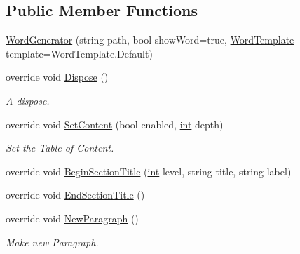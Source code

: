 \subsection*{Public Member Functions}
\begin{DoxyCompactItemize}
\item 
\hyperlink{class_software_engineering_tools_1_1_documentation_1_1_word_generator_af0b26d8845bfd80b944d4a11a2c1124f}{Word\+Generator} (string path, bool show\+Word=true, \hyperlink{class_software_engineering_tools_1_1_documentation_1_1_word_generator_a25625d01bb20e4edcaeede4fde7dcd0e}{Word\+Template} template=Word\+Template.\+Default)
\item 
override void \hyperlink{class_software_engineering_tools_1_1_documentation_1_1_word_generator_adf9f0b03760f695ece98b7c529de9e08}{Dispose} ()
\begin{DoxyCompactList}\small\item\em A dispose. \end{DoxyCompactList}\item 
override void \hyperlink{class_software_engineering_tools_1_1_documentation_1_1_word_generator_acb1d23ef351f76260a319a98751273c2}{Set\+Content} (bool enabled, \hyperlink{namespace_software_engineering_tools_1_1_documentation_a4a8017aa254d1d05b03db5132b7dd3a7afa7153f7ed1cb6c0fcf2ffb2fac21748}{int} depth)
\begin{DoxyCompactList}\small\item\em Set the Table of Content. \end{DoxyCompactList}\item 
override void \hyperlink{class_software_engineering_tools_1_1_documentation_1_1_word_generator_accc00e23ef4d7fa36359715ce4bd3845}{Begin\+Section\+Title} (\hyperlink{namespace_software_engineering_tools_1_1_documentation_a4a8017aa254d1d05b03db5132b7dd3a7afa7153f7ed1cb6c0fcf2ffb2fac21748}{int} level, string title, string label)
\item 
override void \hyperlink{class_software_engineering_tools_1_1_documentation_1_1_word_generator_a6742f94e53dbe5073a80742657e6c938}{End\+Section\+Title} ()
\item 
override void \hyperlink{class_software_engineering_tools_1_1_documentation_1_1_word_generator_a30e09031fd81ba57185fb44d9b0d5f2f}{New\+Paragraph} ()
\begin{DoxyCompactList}\small\item\em Make new Paragraph. \end{DoxyCompactList}\item 

\end{DoxyCompactItemize}
